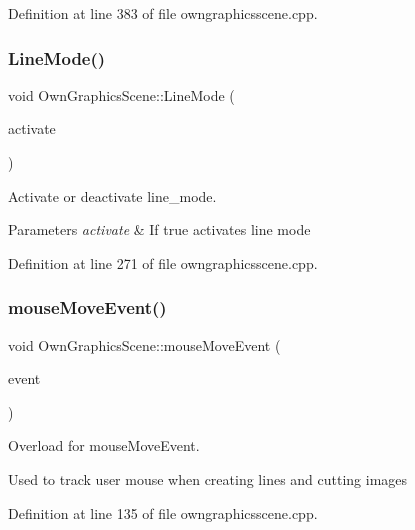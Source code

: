 Definition at line 383 of file owngraphicsscene.\+cpp.

\mbox{\label{classOwnGraphicsScene_a6b7e69131827f0ae64626af378ff9974}} 
\subsubsection{\texorpdfstring{Line\+Mode()}{LineMode()}}
{\footnotesize\ttfamily void Own\+Graphics\+Scene\+::\+Line\+Mode (\begin{DoxyParamCaption}\item[{bool}]{activate }\end{DoxyParamCaption})}



Activate or deactivate line\+\_\+mode. 


\begin{DoxyParams}{Parameters}
{\em activate} & If true activates line mode \\
\hline
\end{DoxyParams}


Definition at line 271 of file owngraphicsscene.\+cpp.

\mbox{\label{classOwnGraphicsScene_ac7f6be2800f09463413459fed74bf34e}} 
\subsubsection{\texorpdfstring{mouse\+Move\+Event()}{mouseMoveEvent()}}
{\footnotesize\ttfamily void Own\+Graphics\+Scene\+::mouse\+Move\+Event (\begin{DoxyParamCaption}\item[{Q\+Graphics\+Scene\+Mouse\+Event $\ast$}]{event }\end{DoxyParamCaption})}



Overload for mouse\+Move\+Event. 

Used to track user mouse when creating lines and cutting images 

Definition at line 135 of file owngraphicsscene.\+cpp.

